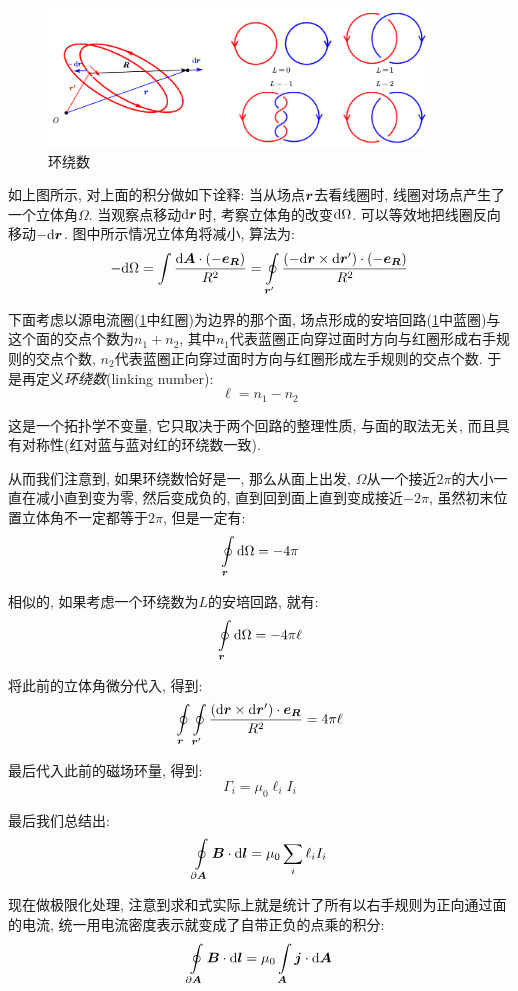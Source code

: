 \begin{figure}[H]
\centering
\includegraphics[width=0.9\textwidth]{image/7-4-8.png}
\caption{环绕数}\label{fig:7-4-8}
\end{figure}

如上图所示, 对上面的积分做如下诠释: 当从场点$\boldsymbol{r}$去看线圈时, 线圈对场点产生了一个立体角$\Omega$. 当观察点移动$\textrm{d}\boldsymbol{r}$时, 考察立体角的改变$\textrm{d} \Omega$. 可以等效地把线圈反向移动$-\textrm{d}\boldsymbol{r}$. 图中所示情况立体角将减小, 算法为:
\[-\textrm{d}\Omega=\int\frac{\textrm{d} \boldsymbol{A}\cdot (-\boldsymbol{e}_{\boldsymbol{R}})}{R^2}=\oint\limits_{\boldsymbol{r}'}\frac{(-\textrm{d} \boldsymbol{r}\times \textrm{d} \boldsymbol{r}') \cdot (-\boldsymbol{e}_{\boldsymbol{R}})}{R^2}\]

下面考虑以源电流圈(\ref{fig:7-4-8}中红圈)为边界的那个面, 场点形成的安培回路(\ref{fig:7-4-8}中蓝圈)与这个面的交点个数为$n_1+n_2$, 其中$n_1$代表蓝圈正向穿过面时方向与红圈形成右手规则的交点个数, $n_2$代表蓝圈正向穿过面时方向与红圈形成左手规则的交点个数. 于是再定义\emph{环绕数}(linking number):
\[\ell=n_1-n_2\]

这是一个拓扑学不变量, 它只取决于两个回路的整理性质, 与面的取法无关, 而且具有对称性(红对蓝与蓝对红的环绕数一致).

从而我们注意到, 如果环绕数恰好是一, 那么从面上出发, $\Omega$从一个接近$2\pi$的大小一直在减小直到变为零, 然后变成负的, 直到回到面上直到变成接近$-2\pi$, 虽然初末位置立体角不一定都等于$2\pi$, 但是一定有:
\[\oint\limits_{\boldsymbol{r}}\textrm{d}\Omega=-4\pi\]

相似的, 如果考虑一个环绕数为$L$的安培回路, 就有:
\[\oint\limits_{\boldsymbol{r}}\textrm{d}\Omega=-4\pi \ell\]

将此前的立体角微分代入, 得到:
\[\oint\limits_{\boldsymbol{r}}\oint\limits_{\boldsymbol{r}'}\frac{(\textrm{d} \boldsymbol{r}\times \textrm{d} \boldsymbol{r}')\cdot \boldsymbol{e}_{\boldsymbol{R}}}{R^2}=4\pi \ell\]

最后代入此前的磁场环量, 得到:
\[\Gamma_i=\mu_0\ell_iI_i\]

最后我们总结出:
\[\oint\limits_{\partial \boldsymbol{A}}\boldsymbol{B}\cdot \textrm{d} \boldsymbol{l}=\mu_0\sum_i \ell_iI_i\]

现在做极限化处理, 注意到求和式实际上就是统计了所有以右手规则为正向通过面的电流, 统一用电流密度表示就变成了自带正负的点乘的积分:
\[\oint\limits_{\partial \boldsymbol{A}}\boldsymbol{B}\cdot \textrm{d} \boldsymbol{l}=\mu_0 \int\limits_{\boldsymbol{A}}\boldsymbol{j}\cdot \textrm{d} \boldsymbol{A}\]

